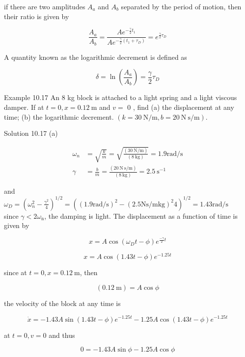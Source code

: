 \documentclass[10pt]{article}
\numberwithin{equation}{section}
\begin{document}
if there are two amplitudes $A_{a}$ and $A_{b}$ separated by the period of motion, then their ratio is given by

$$
\frac{A_{a}}{A_{b}}=\frac{A e^{-\frac{\gamma}{2} t_{1}}}{A e^{-\frac{\gamma}{2}\left(t_{1}+\tau_{D}\right)}}=e^{\frac{\gamma}{2} \tau_{D}}
$$

A quantity known as the logarithmic decrement is defined as

$$
\delta=\ln \left(\frac{A_{a}}{A_{b}}\right)=\frac{\gamma}{2} \tau_{D}
$$

Example 10.17 An 8 kg block is attached to a light spring and a light viscous damper. If at $t=0, x=0.12 \mathrm{~m}$ and $v=$ 0 , find (a) the displacement at any time; (b) the logarithmic decrement. $(k=30 \mathrm{~N} / \mathrm{m}, b=20 \mathrm{~N} \mathrm{~s} / \mathrm{m})$.

Solution 10.17 (a)

$$
\begin{aligned}
\omega_{n} & =\sqrt{\frac{k}{m}}=\sqrt{\frac{(30 \mathrm{~N} / \mathrm{m})}{(8 \mathrm{~kg})}}=1.9 \mathrm{rad} / \mathrm{s} \\
\gamma & =\frac{b}{m}=\frac{(20 \mathrm{~N} \mathrm{~s} / \mathrm{m})}{(8 \mathrm{~kg})}=2.5 \mathrm{~s}^{-1}
\end{aligned}
$$

and\\
$\omega_{D}=\left(\omega_{n}^{2}-\frac{\gamma^{2}}{4}\right)^{1 / 2}=\left((1.9 \mathrm{rad} / \mathrm{s})^{2}-(2.5 \mathrm{Ns} / \mathrm{m} \mathrm{kg})^{2} 4\right)^{1 / 2}=1.43 \mathrm{rad} / \mathrm{s}$\\
since $\gamma<2 \omega_{\mathrm{n}}$, the damping is light. The displacement as a function of time is given by

$$
x=A \cos \left(\omega_{D} t-\phi\right) e^{\frac{-\gamma}{2} t}
$$

$$
x=A \cos (1.43 t-\phi) e^{-1.25 t}
$$

since at $t=0, x=0.12 \mathrm{~m}$, then


\begin{equation}
(0.12 \mathrm{~m})=A \cos \phi \label{eq:10-17}
\end{equation}


the velocity of the block at any time is

$$
\dot{x}=-1.43 A \sin (1.43 t-\phi) e^{-1.25 t}-1.25 A \cos (1.43 t-\phi) e^{-1.25 t}
$$

at $t=0, v=0$ and thus


\begin{equation}
0=-1.43 A \sin \phi-1.25 A \cos \phi \label{eq:10-18}
\end{equation}
\end{document}
